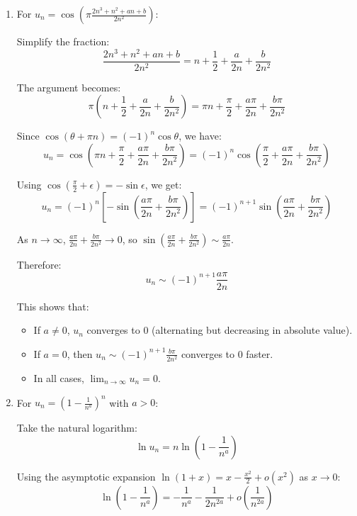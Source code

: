 \documentclass[12pt]{article}
\begin{document}
\begin{answerbox}
\begin{enumerate}
    \item[a)] For $u_n = \cos\left( \pi \frac{2n^3 + n^2 + a n + b}{2n^2} \right)$:
    
    Simplify the fraction:
    \[
    \frac{2n^3 + n^2 + a n + b}{2n^2} = n + \frac{1}{2} + \frac{a}{2n} + \frac{b}{2n^2}
    \]
    
    The argument becomes:
    \[
    \pi\left(n + \frac{1}{2} + \frac{a}{2n} + \frac{b}{2n^2}\right) = \pi n + \frac{\pi}{2} + \frac{a\pi}{2n} + \frac{b\pi}{2n^2}
    \]
    
    Since $\cos(\theta + \pi n) = (-1)^n\cos\theta$, we have:
    \[
    u_n = \cos\left(\pi n + \frac{\pi}{2} + \frac{a\pi}{2n} + \frac{b\pi}{2n^2}\right) = (-1)^n \cos\left(\frac{\pi}{2} + \frac{a\pi}{2n} + \frac{b\pi}{2n^2}\right)
    \]
    
    Using $\cos\left(\frac{\pi}{2} + \epsilon\right) = -\sin\epsilon$, we get:
    \[
    u_n = (-1)^n \left[-\sin\left(\frac{a\pi}{2n} + \frac{b\pi}{2n^2}\right)\right] = (-1)^{n+1} \sin\left(\frac{a\pi}{2n} + \frac{b\pi}{2n^2}\right)
    \]
    
    As $n \to \infty$, $\frac{a\pi}{2n} + \frac{b\pi}{2n^2} \to 0$, so $\sin\left(\frac{a\pi}{2n} + \frac{b\pi}{2n^2}\right) \sim \frac{a\pi}{2n}$.
    
    Therefore:
    \[
    u_n \sim (-1)^{n+1} \frac{a\pi}{2n}
    \]
    
    This shows that:
    \begin{itemize}
        \item If $a \neq 0$, $u_n$ converges to 0 (alternating but decreasing in absolute value).
        \item If $a = 0$, then $u_n \sim (-1)^{n+1} \frac{b\pi}{2n^2}$ converges to 0 faster.
        \item In all cases, $\lim_{n\to\infty} u_n = 0$.
    \end{itemize}
    
    \item[b)] For $u_n = \left( 1 - \frac{1}{n^a} \right)^n$ with $a > 0$:
    
    Take the natural logarithm:
    \[
    \ln u_n = n \ln\left(1 - \frac{1}{n^a}\right)
    \]
    
    Using the asymptotic expansion $\ln(1+x) = x - \frac{x^2}{2} + o(x^2)$ as $x \to 0$:
    \[
    \ln\left(1 - \frac{1}{n^a}\right) = -\frac{1}{n^a} - \frac{1}{2n^{2a}} + o\left(\frac{1}{n^{2a}}\right)
    \]
    

\end{enumerate}
\end{answerbox}
\end{document}
